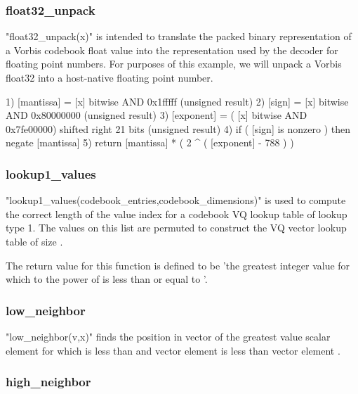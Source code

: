 \subsubsection{float32\_unpack} \label{vorbis:spec:float32:unpack}

"float32\_unpack(x)" is intended to translate the packed binary
representation of a Vorbis codebook float value into the
representation used by the decoder for floating point numbers.  For
purposes of this example, we will unpack a Vorbis float32 into a
host-native floating point number.

\begin{programlisting}
  1) [mantissa] = [x] bitwise AND 0x1fffff (unsigned result)
  2) [sign] = [x] bitwise AND 0x80000000 (unsigned result)
  3) [exponent] = ( [x] bitwise AND 0x7fe00000) shifted right 21 bits (unsigned result)
  4) if ( [sign] is nonzero ) then negate [mantissa]
  5) return [mantissa] * ( 2 ^ ( [exponent] - 788 ) )
\end{programlisting}



\subsubsection{lookup1\_values} \label{vorbis:spec:lookup1:values}

"lookup1\_values(codebook\_entries,codebook\_dimensions)" is used to
compute the correct length of the value index for a codebook VQ lookup
table of lookup type 1.  The values on this list are permuted to
construct the VQ vector lookup table of size
.

The return value for this function is defined to be 'the greatest
integer value for which  to the power of
 is less than or equal to
'.



\subsubsection{low\_neighbor} \label{vorbis:spec:low:neighbor}

"low\_neighbor(v,x)" finds the position  in vector \varname{[v]} of
the greatest value scalar element for which  is less than
\varname{[x]} and vector \varname{[v]} element  is less
than vector \varname{[v]} element \varname{[x]}.

\subsubsection{high\_neighbor} \label{vorbis:spec:high:neighbor}

